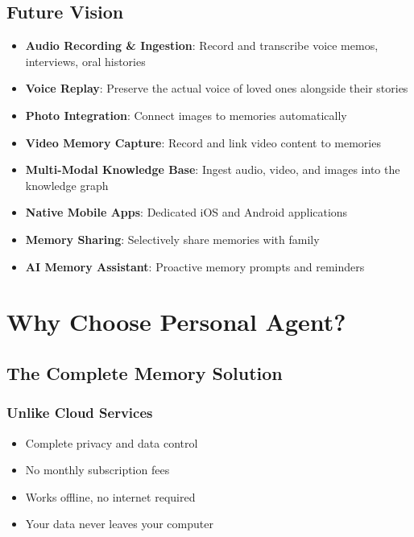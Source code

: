 \documentclass[11pt,letterpaper]{article}
\begin{document}
\subsection{Future Vision}
\begin{itemize}[leftmargin=*]
    \item \textbf{Audio Recording \& Ingestion}: Record and transcribe voice memos, interviews, oral histories
    \item \textbf{Voice Replay}: Preserve the actual voice of loved ones alongside their stories
    \item \textbf{Photo Integration}: Connect images to memories automatically
    \item \textbf{Video Memory Capture}: Record and link video content to memories
    \item \textbf{Multi-Modal Knowledge Base}: Ingest audio, video, and images into the knowledge graph
    \item \textbf{Native Mobile Apps}: Dedicated iOS and Android applications
    \item \textbf{Memory Sharing}: Selectively share memories with family
    \item \textbf{AI Memory Assistant}: Proactive memory prompts and reminders
\end{itemize}

\newpage
\section{Why Choose Personal Agent?}

\subsection{The Complete Memory Solution}

\subsubsection{Unlike Cloud Services}
\begin{itemize}[leftmargin=*]
    \item \textcolor{secondarygreen}{\checkmark} Complete privacy and data control
    \item \textcolor{secondarygreen}{\checkmark} No monthly subscription fees
    \item \textcolor{secondarygreen}{\checkmark} Works offline, no internet required
    \item \textcolor{secondarygreen}{\checkmark} Your data never leaves your computer
\end{itemize}
\end{document}
